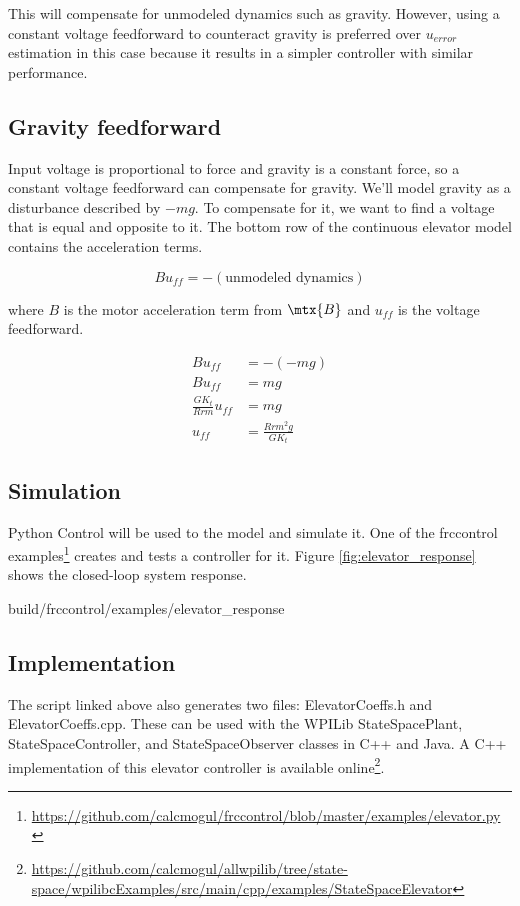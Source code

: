 This will compensate for unmodeled dynamics such as gravity. However, using a
constant voltage feedforward to counteract gravity is preferred over $u_{error}$
estimation in this case because it results in a simpler controller with similar
performance.

\subsection{Gravity feedforward}

Input voltage is proportional to force and gravity is a constant force, so a
constant voltage feedforward can compensate for gravity. We'll model gravity as
a disturbance described by $-mg$. To compensate for it, we want to find a
voltage that is equal and opposite to it. The bottom row of the continuous
elevator model contains the acceleration terms.

\begin{equation*}
  Bu_{ff} = -(\text{unmodeled dynamics})
\end{equation*}

where $B$ is the motor acceleration term from $\mtx{B}$ and $u_{ff}$ is the
voltage feedforward.

\begin{align*}
  Bu_{ff} &= -(-mg) \\
  Bu_{ff} &= mg \\
  \frac{G K_t}{Rrm} u_{ff} &= mg \\
  u_{ff} &= \frac{Rrm^2 g}{G K_t}
\end{align*}

\subsection{Simulation}

Python Control will be used to  the
\gls{model} and simulate it. One of the frccontrol
examples\footnote{\url{https://github.com/calcmogul/frccontrol/blob/master/examples/elevator.py}}
creates and tests a controller for it. Figure \ref{fig:elevator_response} shows
the closed-loop \gls{system} response.

\begin{svg}{build/frccontrol/examples/elevator_response}
  \caption{Elevator response}
  \label{fig:elevator_response}
\end{svg}

\subsection{Implementation}

The script linked above also generates two files: ElevatorCoeffs.h and
ElevatorCoeffs.cpp. These can be used with the WPILib StateSpacePlant,
StateSpaceController, and StateSpaceObserver classes in C++ and Java. A C++
implementation of this elevator controller is available online\footnote{
\url{https://github.com/calcmogul/allwpilib/tree/state-space/wpilibcExamples/src/main/cpp/examples/StateSpaceElevator}}.
